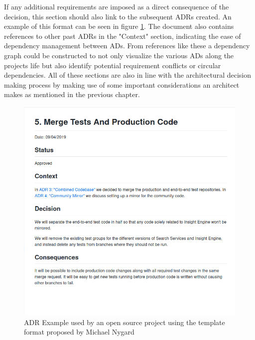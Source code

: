         If any additional requirements are imposed as a direct consequence of the decision, this section should also link to the subsequent ADRs created.
        An example of this format can be seen in figure \ref{fig:ADR_Example_MN}. The document also contains references to other past ADRs in the "Context" section, indicating the ease of dependency management between ADs. From references like these a dependency graph could be constructed to not only visualize the various ADs along the projects life but also identify potential requirement conflicts or circular dependencies. All of these sections are also in line with the architectural decision making process by making use of some important considerations an architect makes as mentioned in the previous chapter. 

        \begin{figure}[]
            \includegraphics[scale=0.5]{figures/ADR_Example.png}
            \caption{ADR Example used by an open source project using the template format proposed by Michael Nygard}
            \label{fig:ADR_Example_MN}
        \end{figure}

